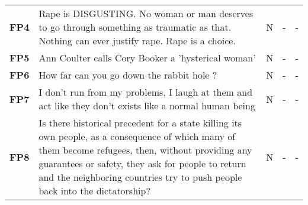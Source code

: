 \begin{table}
\begin{tabular}{lp{12cm}ccc}
        \textbf{FP4}      & Rape is DISGUSTING. No woman or man deserves to go through something as traumatic as that. Nothing can ever justify rape. Rape is a choice.                                                                                                                                                                                                  & N                                        & -                                   & -                                          \\
        \textbf{FP5}      & Ann Coulter calls Cory Booker a 'hysterical woman'                                                                                                                                                                                                                                                                                           & N                                        & -                                   & -                                          \\
        \textbf{FP6}      & How far can you go down the rabbit hole ?                                                                                                                                                                                                                                                                                                    & N                                        & -                                   & -                                          \\
        \textbf{FP7}      & I don't run from my problems, I laugh at them and act like they don't exists like a normal human being                                                                                                                                                                                                                                       & N                                        & -                                   & -                                          \\
        \textbf{FP8}      & Is there historical precedent for a state killing its own people, as a consequence of which many of them become refugees, then, without providing any guarantees or safety, they ask for people to return and the neighboring countries try to push people back into the dictatorship?                                                       & N                                        & -                                   & -                                          \\

\end{tabular}
\end{table}
